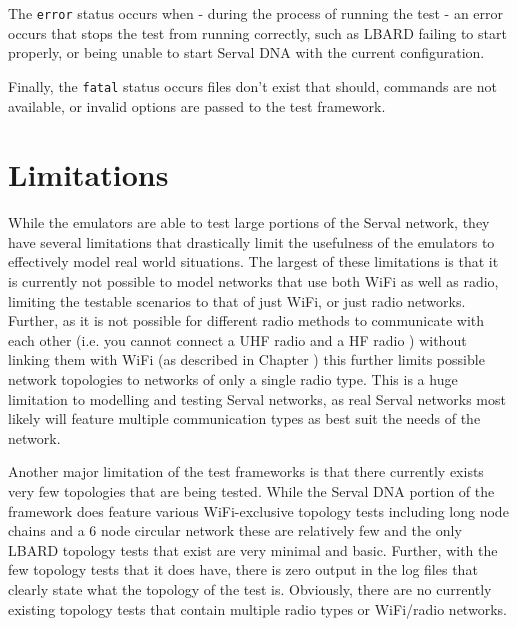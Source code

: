 The \verb|error| status occurs when - during the process of running the test - an error occurs that stops the test from running correctly, such as LBARD failing to start properly, or being unable to start Serval DNA with the current configuration.

Finally, the \verb|fatal| status occurs files don't exist that should, commands are not available, or invalid options are passed to the test framework.



\section{Limitations}
While the emulators are able to test large portions of the Serval network, they have several limitations that drastically limit the usefulness of the emulators to effectively model real world situations.
The largest of these limitations is that it is currently not possible to model networks that use both WiFi as well as radio, limiting the testable scenarios to that of just WiFi, or just radio networks.
Further, as it is not possible for different radio methods to communicate with each other (i.e. you cannot connect a UHF radio and a HF radio ) without linking them with WiFi (as described in Chapter ) this further limits possible network topologies to networks of only a single radio type.
This is a huge limitation to modelling and testing Serval networks, as real Serval networks most likely will feature multiple communication types as best suit the needs of the network.

Another major limitation of the test frameworks is that there currently exists very few topologies that are being tested.
While the Serval DNA portion of the framework does feature various WiFi-exclusive topology tests including long node chains and a 6 node circular network these are relatively few and the only LBARD topology tests that exist are very minimal and basic.
Further, with the few topology tests that it does have, there is zero output in the log files that clearly state what the topology of the test is. 
Obviously, there are no currently existing topology tests that contain multiple radio types or WiFi/radio networks.

